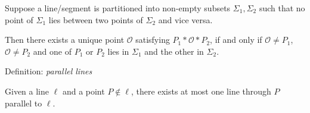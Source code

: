 \begin{minipage}[t]{0.48\linewidth}
\phantom{bob}\smallbreak

Suppose a line/segment is partitioned into non-empty subsets $\Sigma_1,\Sigma_2$ such that no point of $\Sigma_1$ lies between two points of $\Sigma_2$ and vice versa.\par
Then there exists a unique point $\mathcal O$ satisfying $P_1*\mathcal O*P_2$, if and only if $\mathcal O\neq P_1$, $\mathcal O\neq P_2$ and one of $P_1$ or $P_2$ lies in $\Sigma_1$ and the other in $\Sigma_2$.\medbreak



\phantom{bob}\smallbreak

Definition: \emph{parallel lines}\smallbreak

Given a line $\ell$ and a point $P\notin\ell$, there exists at most one line through $P$ parallel to $\ell$.
\end{minipage}


\clearpage



